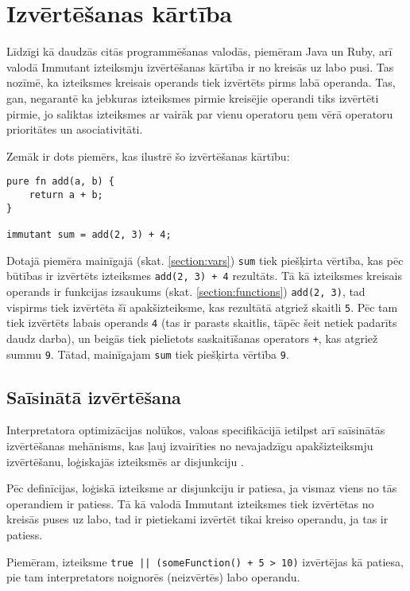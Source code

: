 \documentclass[12pt,a4paper]{report}
\begin{document}
\section{Izvērtēšanas kārtība}
Līdzīgi kā daudzās citās programmēšanas valodās, piemēram Java un Ruby, arī valodā Immutant izteiksmju izvērtēšanas kārtība ir no kreisās uz labo pusi. Tas nozīmē, ka izteiksmes kreisais operands tiek izvērtēts pirms labā operanda. Tas, gan, negarantē ka jebkuras izteiksmes pirmie kreisējie operandi tiks izvērtēti pirmie, jo saliktas izteiksmes ar vairāk par vienu operatoru ņem vērā operatoru prioritātes un asociativitāti.

Zemāk ir dots piemērs, kas ilustrē šo izvērtēšanas kārtību:

\begin{verbatim}
pure fn add(a, b) {
    return a + b;
}

immutant sum = add(2, 3) + 4;
\end{verbatim}

Dotajā piemēra mainīgajā (skat. \ref{section:vars}) \texttt{sum} tiek piešķirta vērtība, kas pēc būtības ir  izvērtēts izteiksmes \texttt{add(2, 3) + 4} rezultāts. Tā kā izteiksmes kreisais operands ir funkcijas izsaukums (skat. \ref{section:functions}) \texttt{add(2, 3)}, tad vispirms tiek izvērtēta šī apakšizteiksme, kas rezultātā atgriež skaitli \texttt{5}. Pēc tam tiek izvērtēts labais operands \texttt{4} (tas ir parasts skaitlis, tāpēc šeit netiek padarīts daudz darba), un beigās tiek pielietots saskaitīšanas operators \texttt{+}, kas atgriež summu \texttt{9}. Tātad, mainīgajam \texttt{sum} tiek piešķirta vērtība \texttt{9}.

\subsection{Saīsinātā izvērtēšana}

Interpretatora optimizācijas nolūkos, valoas specifikācijā ietilpst arī saīsinātās izvērtēšanas mehānisms, kas ļauj izvairīties no nevajadzīgu apakšizteiksmju izvērtēšanu, loģiskajās izteiksmēs ar disjunkciju \cite{short-circuit-logic}.

Pēc definīcijas, loģiskā izteiksme ar disjunkciju ir patiesa, ja vismaz viens no tās operandiem ir patiess.
Tā kā valodā Immutant izteiksmes tiek izvērtētas no kreisās puses uz labo, tad ir pietiekami izvērtēt tikai kreiso operandu, ja tas ir patiess.

Piemēram, izteiksme \texttt{true || (someFunction() + 5 > 10)} izvērtējas kā patiesa, pie tam interpretators noignorēs (neizvērtēs) labo operandu.
\end{document}

